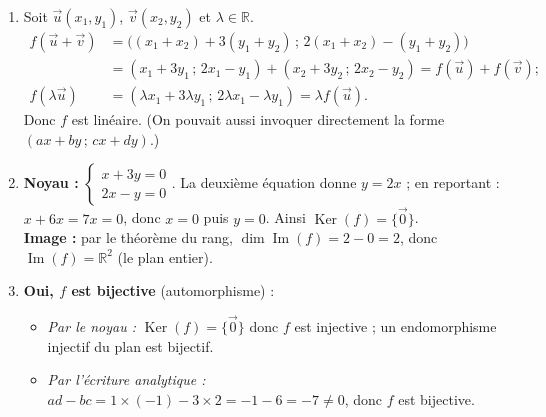 \documentclass[11pt]{article}
\begin{document}
\begin{corrige}
\begin{enumerate}
\item Soit $\vec{u}(x_1,y_1)$, $\vec{v}(x_2,y_2)$ et $\lambda\in\mathbb{R}$.
\begin{align*}
f(\vec{u}+\vec{v}) &= \bigl((x_1+x_2)+3(y_1+y_2)\,;\,2(x_1+x_2)-(y_1+y_2)\bigr)\\
&= (x_1+3y_1\,;\,2x_1-y_1)+(x_2+3y_2\,;\,2x_2-y_2) = f(\vec{u})+f(\vec{v}) ;\\
f(\lambda\vec{u}) &= (\lambda x_1+3\lambda y_1\,;\,2\lambda x_1-\lambda y_1) = \lambda f(\vec{u}).
\end{align*}
Donc $f$ est linéaire. (On pouvait aussi invoquer directement la forme $(ax+by\,;\,cx+dy)$.)
\item \textbf{Noyau :} $\begin{cases} x+3y=0 \\ 2x-y=0 \end{cases}$. La deuxième équation donne $y=2x$ ; en reportant : $x+6x=7x=0$, donc $x=0$ puis $y=0$. Ainsi $\operatorname{Ker}(f)=\{\vec{0}\}$.\\
\textbf{Image :} par le théorème du rang, $\dim\operatorname{Im}(f)=2-0=2$, donc $\operatorname{Im}(f)=\mathbb{R}^2$ (le plan entier).
\item \textbf{Oui, $f$ est bijective} (automorphisme) :
\begin{itemize}
\item \emph{Par le noyau :} $\operatorname{Ker}(f)=\{\vec{0}\}$ donc $f$ est injective ; un endomorphisme injectif du plan est bijectif.
\item \emph{Par l'écriture analytique :} $ad-bc=1\times(-1)-3\times 2=-1-6=-7\neq 0$, donc $f$ est bijective.
\end{itemize}
\end{enumerate}
\end{corrige}
\end{document}
